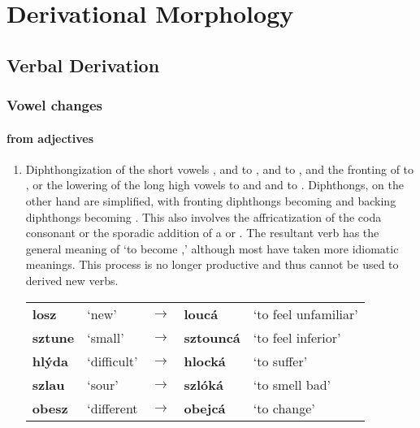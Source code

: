 \chapter{Derivational Morphology}

\section{Verbal Derivation}
\subsection{Vowel changes}
\subsubsection{from adjectives}
\begin{enumerate}
	\item Diphthongization of the short vowels ,  and  to ,  and  to , and the fronting of  to , or the lowering of the long high vowels  to  and  and  to . Diphthongs, on the other hand are simplified, with fronting diphthongs becoming  and backing diphthongs becoming . This also involves the affricatization of the coda consonant or the sporadic addition of a  or . The resultant verb has the general meaning of `to become ,' although most have taken more idiomatic meanings. This process is no longer productive and thus cannot be used to derived new verbs.
	
	\begin{table}[h!]
		\small\centering
		\begin{tabu}to 0.9
			losz&`new'&$\rightarrow$&loucá&`to feel unfamiliar'\\
			sztune&`small'&$\rightarrow$&sztouncá &`to feel inferior'\\
			hlýda & `difficult'&$\rightarrow$&hlocká &`to suffer'\\
			szlau & `sour'&$\rightarrow$&szlóká & `to smell bad'\\
			obesz & `different&$\rightarrow$&obejcá&`to change'\\
		\end{tabu}
	\end{table}
	
\end{enumerate}
